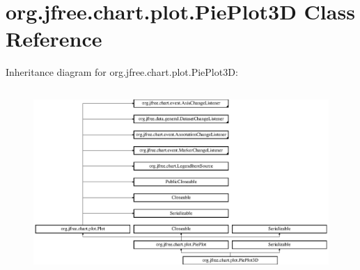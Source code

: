 \hypertarget{classorg_1_1jfree_1_1chart_1_1plot_1_1_pie_plot3_d}{}\section{org.\+jfree.\+chart.\+plot.\+Pie\+Plot3D Class Reference}
\label{classorg_1_1jfree_1_1chart_1_1plot_1_1_pie_plot3_d}
Inheritance diagram for org.\+jfree.\+chart.\+plot.\+Pie\+Plot3D\+:\begin{figure}[H]
\begin{center}
\leavevmode
\includegraphics[height=7.080460cm]{classorg_1_1jfree_1_1chart_1_1plot_1_1_pie_plot3_d}
\end{center}
\end{figure}
